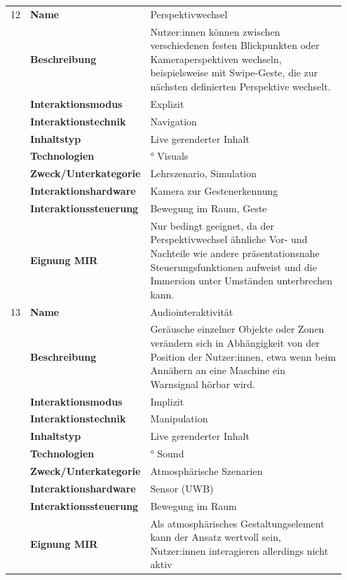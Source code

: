\begin{longtable}{p{0.03\linewidth} p{0.27\linewidth}
    >{\raggedright\arraybackslash}p{0.65\linewidth}}
    12   & \textbf{Name} & Perspektivwechsel \\
        & \textbf{Beschreibung} & Nutzer:innen können zwischen verschiedenen festen Blickpunkten oder Kameraperspektiven wechseln, beispielsweise mit Swipe-Geste, die zur nächsten definierten Perspektive wechselt. \\
        & \textbf{Interaktionsmodus} & Explizit \\
        & \textbf{Interaktionstechnik} & Navigation \\
        & \textbf{Inhaltstyp} & Live gerenderter Inhalt \\
        & \textbf{Technologien} & 270° Visuals \\
        & \textbf{Zweck/Unterkategorie} & Lehrszenario, Simulation \\
        & \textbf{Interaktionshardware} & Kamera zur Gestenerkennung \\
        & \textbf{Interaktionssteuerung} & Bewegung im Raum, Geste \\
        & \textbf{Eignung MIR} & Nur bedingt geeignet, da der Perspektivwechsel ähnliche Vor- und Nachteile wie andere präsentationsnahe Steuerungsfunktionen aufweist und die Immersion unter Umständen unterbrechen kann. \\
    \midrule

    13  & \textbf{Name} & Audiointeraktivität \\
        & \textbf{Beschreibung} & Geräusche einzelner Objekte oder Zonen verändern sich in Abhängigkeit von der Position der Nutzer:innen, etwa wenn beim Annähern an eine Maschine ein Warnsignal hörbar wird. \\
        & \textbf{Interaktionsmodus} & Implizit \\
        & \textbf{Interaktionstechnik} & Manipulation \\
        & \textbf{Inhaltstyp} & Live gerenderter Inhalt \\
        & \textbf{Technologien} & 360° Sound \\
        & \textbf{Zweck/Unterkategorie} & Atmosphärische Szenarien \\
        & \textbf{Interaktionshardware} & Sensor (UWB) \\
        & \textbf{Interaktionssteuerung} & Bewegung im Raum \\
        & \textbf{Eignung MIR} & Als atmosphärisches Gestaltungselement kann der Ansatz wertvoll sein, Nutzer:innen interagieren allerdings nicht aktiv \\
    \midrule


\end{longtable}
